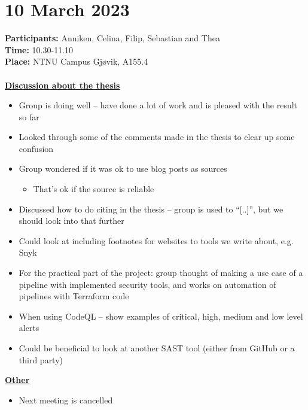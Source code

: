\section{10 March 2023}
\textbf{Participants:} Anniken, Celina, Filip, Sebastian and Thea\\
\textbf{Time:} 10.30-11.10 \\
\textbf{Place:} NTNU Campus Gjøvik, A155.4
\\~\\
\textbf{\underline{Discussion about the thesis}}
\begin{itemize}
    \item Group is doing well – have done a lot of work and is pleased with the result so far 
    \item Looked through some of the comments made in the thesis to clear up some confusion
    \item Group wondered if it was ok to use blog posts as sources 
        \begin{itemize}
            \item That’s ok if the source is reliable 
        \end{itemize}
    \item Discussed how to do citing in the thesis – group is used to “[..]”, but we should look into that further
    \item Could look at including footnotes for websites to tools we write about, e.g. Snyk 
    \item For the practical part of the project: group thought of making a use case of a pipeline with implemented security tools, and works on automation of pipelines with Terraform code 
    \item When using CodeQL – show examples of critical, high, medium and low level alerts 
    \item Could be beneficial to look at another SAST tool (either from GitHub or a third party) 
\end{itemize}

\textbf{\underline{Other}}
\begin{itemize}
    \item Next meeting is cancelled  
\end{itemize}